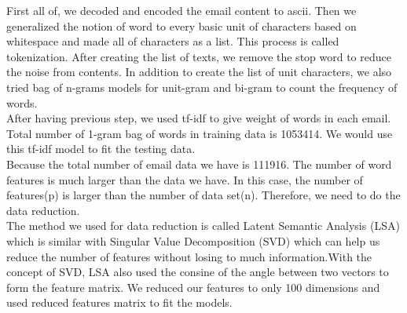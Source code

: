First all of, we decoded and encoded the email content to ascii. Then we generalized the notion of word to every basic unit of characters based on whitespace and made all of characters as a list. This process is called tokenization. After creating the list of texts, we remove the stop word to reduce the noise from contents. In addition to create the list of unit characters, we also tried bag of n-grams models for unit-gram and bi-gram to count the frequency of words.\\

After having previous step, we used tf-idf to give weight of words in each email. Total number of 1-gram bag of words in training data is 1053414. We would use this tf-idf model to fit the testing data.\\ Because the total number of email data we have is 111916. The number of word features is much larger than the data we have. In this case, the number of features(p) is larger than the number of data set(n). Therefore, we need to do the data reduction.\\

The method we used for data reduction is called Latent Semantic Analysis (LSA) which is similar with Singular Value Decomposition (SVD) which can help us reduce the number of features without losing to much information.With the concept of SVD, LSA also used the consine of the angle between two vectors to form the feature matrix. We reduced our features to only 100 dimensions and used reduced features matrix to fit the models.

